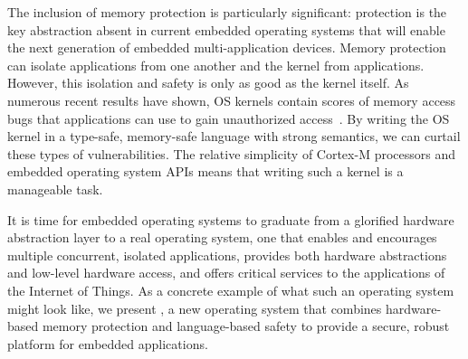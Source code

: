 The inclusion of memory protection is particularly significant: protection is
the key abstraction absent in current embedded operating systems that will
enable the next generation of embedded multi-application devices. Memory
protection can isolate applications from one another and the kernel from
applications. However, this isolation and safety is only as good as the kernel
itself. As numerous recent results have shown, OS kernels contain scores of
memory access bugs that applications can use to gain unauthorized
access~\cite{nickolai}. By writing the OS kernel in a type-safe, memory-safe
language with strong semantics, we can curtail these types of vulnerabilities.
The relative simplicity of Cortex-M processors and embedded operating system
APIs means that writing such a kernel is a manageable task.

It is time for embedded operating systems to graduate from a glorified hardware
abstraction layer to a real operating system, one that enables and encourages
multiple concurrent, isolated applications, provides both hardware abstractions
and low-level hardware access, and offers critical services to the applications
of the Internet of Things. As a concrete example of what such an operating
system might look like, we present \name, a new operating system that combines
hardware-based memory protection and language-based safety to provide a secure,
robust platform for embedded applications.

%
